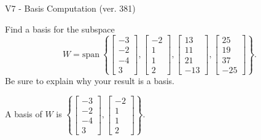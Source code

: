 \begin{exercise}
  \begin{exerciseTitle}V7 - Basis Computation (ver. 381)\end{exerciseTitle}
  \begin{exerciseStatement}
    Find a basis for the subspace 
\[W=\mathrm{span}\ \left\{\left[\begin{array}{r}
-3 \\
-2 \\
-4 \\
3
\end{array}\right] , \left[\begin{array}{r}
-2 \\
1 \\
1 \\
2
\end{array}\right] , \left[\begin{array}{r}
13 \\
11 \\
21 \\
-13
\end{array}\right] , \left[\begin{array}{r}
25 \\
19 \\
37 \\
-25
\end{array}\right]\right\}.\]
 Be sure to explain why your result is a basis.


  \end{exerciseStatement}
  \begin{exerciseAnswer}
   A basis of \(W\) is  \(\left\{\left[\begin{array}{r}
-3 \\
-2 \\
-4 \\
3
\end{array}\right] , \left[\begin{array}{r}
-2 \\
1 \\
1 \\
2
\end{array}\right]\right\}\).
  


  \end{exerciseAnswer}
\end{exercise}